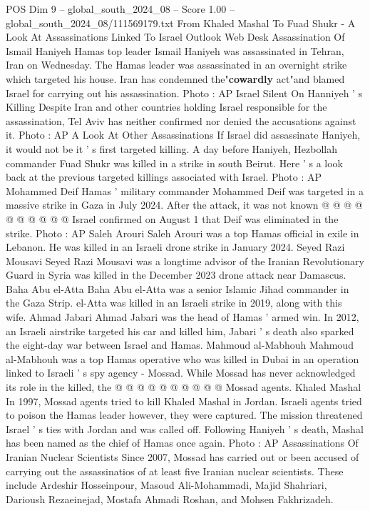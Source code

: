 \begin{textsample}{POS Dim 9 – global\_south\_2024\_08 – Score 1.00 – global\_south\_2024\_08/111569179.txt}  \label{ex:f9_pos_117}
From Khaled Mashal To Fuad Shukr - A Look At Assassinations Linked To Israel Outlook Web Desk Assassination Of Ismail Haniyeh Hamas top leader Ismail Haniyeh was assassinated in Tehran, Iran on Wednesday.
The Hamas leader was assassinated in an overnight strike which targeted his house.
Iran has condemned the"\textbf{cowardly} act"and blamed Israel for carrying out his assassination.
Photo : AP Israel Silent On Hanniyeh ' s Killing Despite Iran and other countries holding Israel responsible for the assassination, Tel Aviv has neither confirmed nor denied the accusations against it.
Photo : AP A Look At Other Assassinations If Israel did assassinate Haniyeh, it would not be it ' s first targeted killing.
A day before Haniyeh, Hezbollah commander Fuad Shukr was killed in a strike in south Beirut.
Here ' s a look back at the previous targeted killings associated with Israel.
Photo : AP Mohammed Deif Hamas ' military commander Mohammed Deif was targeted in a massive strike in Gaza in July 2024.
After the attack, it was not known @ @ @ @ @ @ @ @ @ @ Israel confirmed on August 1 that Deif was eliminated in the strike.
Photo : AP Saleh Arouri Saleh Arouri was a top Hamas official in exile in Lebanon.
He was killed in an Israeli drone strike in January 2024.
Seyed Razi Mousavi Seyed Razi Mousavi was a longtime advisor of the Iranian Revolutionary Guard in Syria was killed in the December 2023 drone attack near Damascus.
Baha Abu el-Atta Baha Abu el-Atta was a senior Islamic Jihad commander in the Gaza Strip. el-Atta was killed in an Israeli strike in 2019, along with this wife.
Ahmad Jabari Ahmad Jabari was the head of Hamas ' armed win.
In 2012, an Israeli airstrike targeted his car and killed him, Jabari ' s death also sparked the eight-day war between Israel and Hamas.
Mahmoud al-Mabhouh Mahmoud al-Mabhouh was a top Hamas operative who was killed in Dubai in an operation linked to Israeli ' s spy agency - Mossad.
While Mossad has never acknowledged its role in the killed, the @ @ @ @ @ @ @ @ @ @ Mossad agents.
Khaled Mashal In 1997, Mossad agents tried to kill Khaled Mashal in Jordan.
Israeli agents tried to poison the Hamas leader however, they were captured.
The mission threatened Israel ' s ties with Jordan and was called off.
Following Haniyeh ' s death, Mashal has been named as the chief of Hamas once again.
Photo : AP Assassinations Of Iranian Nuclear Scientists Since 2007, Mossad has carried out or been accused of carrying out the assassinatios of at least five Iranian nuclear scientists.
These include Ardeshir Hosseinpour, Masoud Ali-Mohammadi, Majid Shahriari, Darioush Rezaeinejad, Mostafa Ahmadi Roshan, and Mohsen Fakhrizadeh.

\end{textsample}
